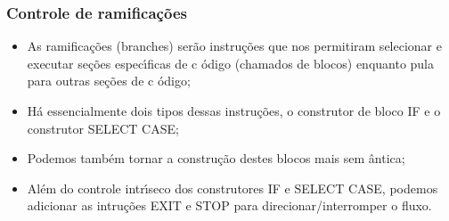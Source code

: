 \documentclass[xcolor=table]{beamer}
\newenvironment{stepitemize}{\begin{itemize}[<+->]}{\end{itemize} }
\begin{document}
\begin{frame}%

\frametitle{Controle de ramifica\c{c}\~{o}es}

\begin{stepitemize}
\item As ramifica\c{c}\~{o}es (branches) ser\~{a}o instru\c{c}\~{o}es que
nos permitiram selecionar e executar se\c{c}\~{o}es espec\'{\i}ficas de c%
\'{o}digo (chamados de blocos) enquanto pula para outras se\c{c}\~{o}es de c%
\'{o}digo;

\item H\'{a} essencialmente dois tipos dessas instru\c{c}\~{o}es, o
construtor de bloco IF e o construtor SELECT CASE;

\item Podemos tamb\'{e}m tornar a constru\c{c}\~{a}o destes blocos mais sem%
\^{a}ntica;

\item Al\'{e}m do controle intr\'{\i}seco dos construtores IF e SELECT CASE,
podemos adicionar as intru\c{c}\~{o}es EXIT e STOP para
direcionar/interromper o fluxo.
\end{stepitemize}

\transboxout%
\end{frame}%
\end{document}
